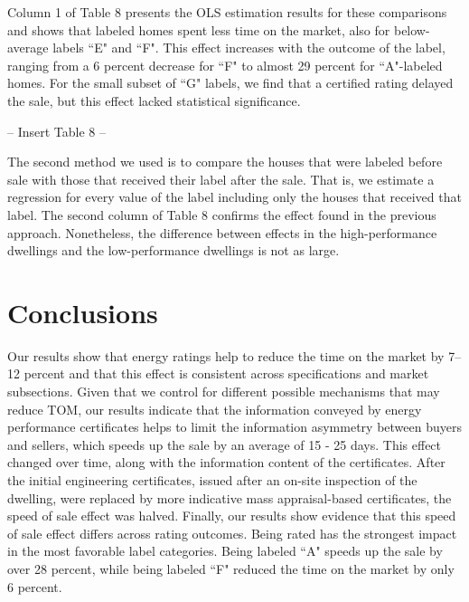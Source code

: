 \documentclass[12pt]{article}
\begin{document}
Column 1 of Table 8 presents the OLS estimation results for these comparisons and shows that labeled homes spent less time on the market, also for below-average labels ``E" and ``F". This effect increases with the outcome of the label, ranging from a 6 percent decrease for ``F" to almost 29 percent for ``A"-labeled homes. For the small subset of ``G" labels, we find that a certified rating delayed the sale, but this effect lacked statistical significance. 

\begin{center}
-- Insert Table 8 --
\end{center}

The second method we used is to compare the houses that were labeled before sale with those that received their label after the sale. That is, we estimate a regression for every value of the label including only the houses that received that label. The second column of Table 8 confirms the effect found in the previous approach. Nonetheless, the difference between effects in the high-performance dwellings and the low-performance dwellings is not as large.

\section{Conclusions}

Our results show that energy ratings help to reduce the time on the market by 7–12 percent and that this effect is consistent across specifications and market subsections. Given that we control for different possible mechanisms that may reduce TOM, our results indicate that the information conveyed by energy performance certificates helps to limit the information asymmetry between buyers and sellers, which speeds up the sale by an average of 15 - 25 days. This effect changed over time, along with the information content of the certificates. After the initial engineering certificates, issued after an on-site inspection of the dwelling, were replaced by more indicative mass appraisal-based certificates, the speed of sale effect was halved. Finally, our results show evidence that this speed of sale effect differs across rating outcomes. Being rated has the strongest impact in the most favorable label categories. Being labeled ``A" speeds up the sale by over 28 percent, while being labeled ``F" reduced the time on the market by only 6 percent. 
\end{document}
